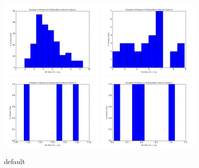 \documentclass[english, apj]{emulateapj}
\begin{document}
\begin{figure}[htbp]
\begin{center}
\includegraphics[width=0.45\textwidth]{plots/orbiting_bh_mass_histogram_gal_1.png}
\includegraphics[width=0.45\textwidth]{plots/orbiting_bh_mass_histogram_gal_65.png}\\
\includegraphics[width=0.45\textwidth]{plots/orbiting_bh_mass_histogram_gal_187.png}
\includegraphics[width=0.45\textwidth]{plots/orbiting_bh_mass_histogram_gal_217.png}\\
\caption{default}
\label{default}
\end{center}
\end{figure}
\end{document}
